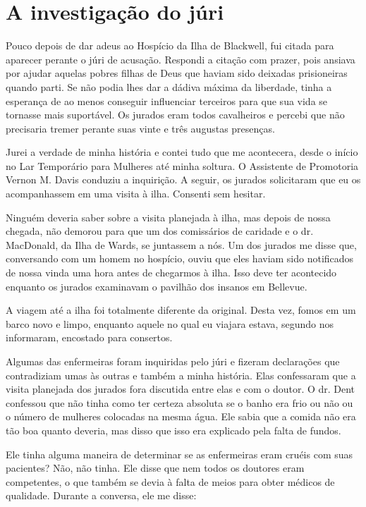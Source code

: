 \chapter{A investigação do
júri}\label{capuxedtulo-xvii-a-investigauxe7uxe3o-do-juxfari}

Pouco depois de dar adeus ao Hospício da Ilha de Blackwell, fui citada
para aparecer perante o júri de acusação. Respondi a citação com prazer,
pois ansiava por ajudar aquelas pobres filhas de Deus que haviam sido
deixadas prisioneiras quando parti. Se não podia lhes dar a dádiva
máxima da liberdade, tinha a esperança de ao menos conseguir influenciar
terceiros para que sua vida se tornasse mais suportável. Os jurados eram
todos cavalheiros e percebi que não precisaria tremer perante suas vinte
e três augustas presenças.

Jurei a verdade de minha história e contei tudo que me acontecera, desde
o início no Lar Temporário para Mulheres até minha soltura. O Assistente
de Promotoria Vernon M. Davis conduziu a inquirição. A seguir, os
jurados solicitaram que eu os acompanhassem em uma visita à ilha.
Consenti sem hesitar.

Ninguém deveria saber sobre a visita planejada à ilha, mas depois de
nossa chegada, não demorou para que um dos comissários de caridade e o
dr. MacDonald, da Ilha de Wards, se juntassem a nós. Um dos jurados me
disse que, conversando com um homem no hospício, ouviu que eles haviam
sido notificados de nossa vinda uma hora antes de chegarmos à ilha. Isso
deve ter acontecido enquanto os jurados examinavam o pavilhão dos
insanos em Bellevue.

A viagem até a ilha foi totalmente diferente da original. Desta vez,
fomos em um barco novo e limpo, enquanto aquele no qual eu viajara
estava, segundo nos informaram, encostado para consertos.

Algumas das enfermeiras foram inquiridas pelo júri e fizeram declarações
que contradiziam umas às outras e também a minha história. Elas
confessaram que a visita planejada dos jurados fora discutida entre elas
e com o doutor. O dr. Dent confessou que não tinha como ter certeza
absoluta se o banho era frio ou não ou o número de mulheres colocadas na
mesma água. Ele sabia que a comida não era tão boa quanto deveria, mas
disso que isso era explicado pela falta de fundos.

Ele tinha alguma maneira de determinar se as enfermeiras eram cruéis com
suas pacientes? Não, não tinha. Ele disse que nem todos os doutores eram
competentes, o que também se devia à falta de meios para obter médicos
de qualidade. Durante a conversa, ele me disse:

